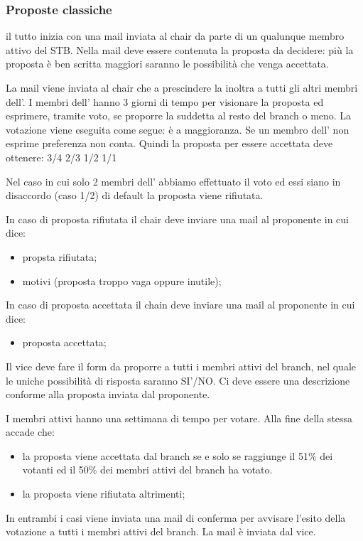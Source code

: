 \documentclass[pdf]{article}
\theoremstyle{definition}
\begin{document}
\subsubsection{Proposte classiche}

il tutto inizia con una mail inviata al chair da parte di un qualunque membro attivo del STB. Nella mail deve essere contenuta la proposta da decidere: più la proposta è ben scritta maggiori saranno le possibilità che venga accettata. 

La mail viene inviata al chair che a prescindere la inoltra a tutti gli altri membri dell'\EC{}. I membri dell'\EC{} hanno 3 giorni di tempo per visionare la proposta ed esprimere, tramite voto, se proporre la suddetta al resto del branch o meno.
La votazione viene eseguita come segue:
è a maggioranza. Se un membro dell'\EC{} non esprime preferenza non conta. Quindi la proposta per essere accettata deve ottenere:
3/4
2/3
1/2
1/1

Nel caso in cui solo 2 membri dell'\EC{} abbiamo effettuato il voto ed essi siano in disaccordo (caso 1/2) di default la proposta viene rifiutata.

In caso di proposta rifiutata il chair deve inviare una mail al proponente in cui dice:
\begin{itemize}
	\item propsta rifiutata;
	\item motivi (proposta troppo vaga oppure inutile);
\end{itemize}

In caso di proposta accettata il chain deve inviare una mail al proponente in cui dice:
\begin{itemize}
	\item proposta accettata;
\end{itemize}

Il vice deve fare il form da proporre a tutti i membri attivi del branch, nel quale le uniche possibilità di risposta saranno SI'/NO. Ci deve essere una descrizione conforme alla proposta inviata dal proponente. 

I membri attivi hanno una settimana di tempo per votare. Alla fine della stessa accade che:

\begin{itemize}
	\item la proposta viene accettata dal branch se e solo se raggiunge il 51\% dei votanti ed il 50\% dei membri attivi del branch ha votato.
	\item la proposta viene rifiutata altrimenti;
\end{itemize}

In entrambi i casi viene inviata una mail di conferma per  avvisare l'esito della votazione a tutti i membri attivi del branch. La mail è inviata dal vice.
\end{document}
